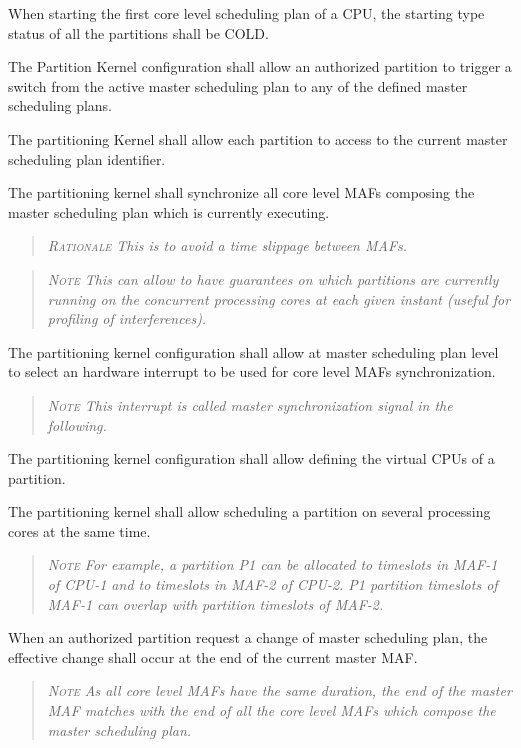 When starting the first core level scheduling plan of a CPU, the starting type status of all the partitions shall be COLD.

The Partition Kernel configuration shall allow an authorized partition to trigger a switch from the active master scheduling plan to any of the defined master scheduling plans.

The partitioning Kernel shall allow each partition to access to the current master scheduling plan identifier.

The partitioning kernel shall synchronize all core level MAFs composing the master scheduling plan which is currently executing.
\begin{quote}\it
\textsc{Rationale}
This is to avoid a time slippage between MAFs.
\end{quote}
\begin{quote}\it
\textsc{Note}
This can allow to have guarantees on which partitions are currently running on the concurrent processing cores at each given instant (useful for profiling of interferences).
\end{quote}

The partitioning kernel configuration shall allow at master scheduling plan level to select an hardware interrupt to be used for core level MAFs synchronization.
\begin{quote}\it
\textsc{Note}
This interrupt is called master synchronization signal in the following.
\end{quote}

The partitioning kernel configuration shall allow defining the virtual CPUs of a partition.

The partitioning kernel shall allow scheduling a partition on several processing cores at the same time.
\begin{quote}\it
\textsc{Note}
For example, a partition P1 can be allocated to timeslots in MAF-1 of CPU-1 and to timeslots in MAF-2 of CPU-2. P1 partition timeslots of MAF-1 can overlap with partition timeslots of MAF-2.
\end{quote}

When an authorized partition request a change of master scheduling plan, the effective change shall occur at the end of the current master MAF.
\begin{quote}\it
\textsc{Note}
As all core level MAFs have the same duration, the end of the master MAF matches with the end of all the core level MAFs which compose the master scheduling plan.
\end{quote}

